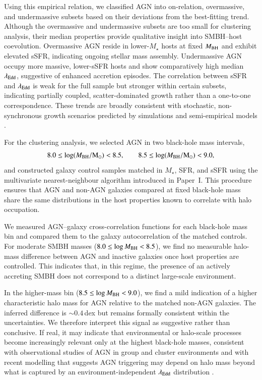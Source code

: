 \documentclass{aa}
\begin{document}
Using this empirical relation, we classified AGN into on-relation,
overmassive, and undermassive subsets based on their deviations from the
best-fitting trend. Although the overmassive and undermassive subsets are too
small for clustering analysis, their median properties provide qualitative
insight into SMBH–host coevolution. Overmassive AGN reside in lower-$M_\star$
hosts at fixed $M_{\rm BH}$ and exhibit elevated sSFR, indicating ongoing
stellar mass assembly. Undermassive AGN occupy more massive, lower-sSFR hosts
and show comparatively high median $\lambda_{\rm Edd}$, suggestive of enhanced
accretion episodes. The correlation between sSFR and $\lambda_{\rm Edd}$ is weak
for the full sample but stronger within certain subsets, indicating partially
coupled, scatter-dominated growth rather than a one-to-one correspondence.
These trends are broadly consistent with stochastic, non-synchronous growth
scenarios predicted by simulations and semi-empirical models
\citep[e.g.][]{Aversa2016, Shankar2016, Shankar2020}.

For the clustering analysis, we selected AGN in two black-hole mass intervals,
\[
8.0 \le \log(M_{\rm BH}/{\rm M_\odot}) < 8.5, \qquad
8.5 \le \log(M_{\rm BH}/{\rm M_\odot}) < 9.0,
\]
and constructed galaxy control samples matched in $M_\star$, SFR, and sSFR
using the multivariate nearest-neighbour algorithm introduced in Paper~I.
This procedure ensures that AGN and non-AGN galaxies compared at fixed
black-hole mass share the same distributions in the host properties known to
correlate with halo occupation.

We measured AGN–galaxy cross-correlation functions for each black-hole mass bin
and compared them to the galaxy autocorrelation of the matched controls.
For moderate SMBH masses
($8.0 \le \log M_{\rm BH} < 8.5$), we find no measurable halo-mass difference
between AGN and inactive galaxies once host properties are controlled.
This indicates that, in this regime, the presence of an actively accreting SMBH
does not correspond to a distinct large-scale environment.

In the higher-mass bin ($8.5 \le \log M_{\rm BH} < 9.0$), we find a mild
indication of a higher characteristic halo mass for AGN relative to the matched
non-AGN galaxies. The inferred difference is $\sim0.4$\,dex but remains
formally consistent within the uncertainties. We therefore interpret this
signal as suggestive rather than conclusive. If real, it may indicate that
environmental or halo-scale processes become increasingly relevant only at
the highest black-hole masses, consistent with observational studies of AGN
in group and cluster environments \citep[e.g.][]{Martini2007, Martini2013}
and with recent modelling that suggests AGN triggering may depend on halo
mass beyond what is captured by an environment-independent $\lambda_{\rm Edd}$
distribution \citep[e.g.][]{Georgakakis2023, Munoz2024}.
\end{document}
